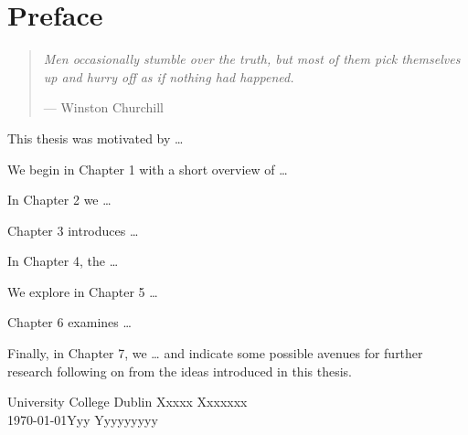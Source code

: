%
%
%
%

\chapter*{Preface}


\begin{quote}
\noindent\textit{Men occasionally stumble over the truth, but most of them pick themselves up and 
hurry off as if nothing had happened.}
 
\hspace{2cm}--- Winston Churchill
\end{quote}

This thesis was motivated by \ldots

We begin in Chapter 1 with a short overview of \ldots 

In Chapter 2 we \ldots 

Chapter 3 introduces \ldots 

In Chapter 4, the \ldots 

We explore in Chapter 5 \ldots 

Chapter 6 examines \ldots 

Finally, in Chapter 7, we \ldots{} 
and indicate some possible avenues for further research following on from the ideas introduced in this thesis.

\vspace{2em}

University College Dublin \hfill Xxxxx Xxxxxxx \\
\today \hfill Yyy Yyyyyyyyy
